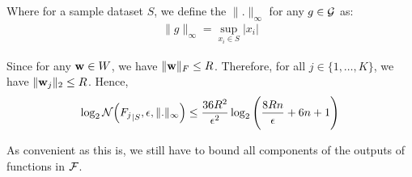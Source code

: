 \noindent Where for a sample dataset $S$, we define the $\|.\|_\infty$ for any $g\in \mathcal{G}$ as:
\begin{align*}
    \|g\|_\infty = \sup_{x_i \in S} |x_i|
\end{align*} 

\noindent Since for any ${\bf w}\in W$, we have $\|{\bf w}\|_F\le R$. Therefore, for all $j\in\{1, \dots, K\}$, we have $\|{\bf w}_j\|_2\le R$. Hence,
\begin{align*}
    \log_2\mathcal{N}\Big( {F_j}_{|S}, \epsilon, \|.\|_\infty \Big) \le \frac{36R^2}{\epsilon^2}\log_2\Bigg( \frac{8Rn}{\epsilon} + 6n + 1 \Bigg)
\end{align*}

\noindent \color{red}As convenient as this is, we still have to bound all components of the outputs of functions in $\mathcal{F}$.\color{black}

